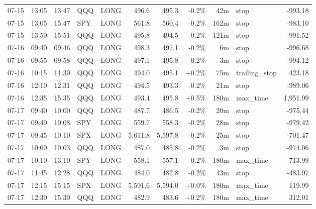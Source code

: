 \documentclass[11pt,a4paper,twoside]{article}
\begin{document}
\begin{center}
\begin{longtable}{>{\color{txtmain}}l l l l l r r r r >{\color{txtmain}}l r}
07-15 & 13:05 & 13:47 & QQQ & LONG & 496.6 & 495.3 & \textcolor{lossred}{-0.2\%} & 42m & stop & \textcolor{lossred}{-993.18} \\
07-15 & 13:05 & 15:47 & SPY & LONG & 561.8 & 560.4 & \textcolor{lossred}{-0.2\%} & 162m & stop & \textcolor{lossred}{-983.10} \\
07-15 & 13:50 & 15:51 & QQQ & LONG & 495.8 & 494.5 & \textcolor{lossred}{-0.2\%} & 121m & stop & \textcolor{lossred}{-991.52} \\
07-16 & 09:40 & 09:46 & QQQ & LONG & 498.3 & 497.1 & \textcolor{lossred}{-0.2\%} & 6m & stop & \textcolor{lossred}{-996.68} \\
07-16 & 09:55 & 09:58 & QQQ & LONG & 497.1 & 495.8 & \textcolor{lossred}{-0.2\%} & 3m & stop & \textcolor{lossred}{-994.12} \\
07-16 & 10:15 & 11:30 & QQQ & LONG & 494.0 & 495.1 & \textcolor{wingreen}{+0.2\%} & 75m & trailing\_stop & \textcolor{wingreen}{423.18} \\
07-16 & 12:10 & 12:31 & QQQ & LONG & 494.5 & 493.3 & \textcolor{lossred}{-0.2\%} & 21m & stop & \textcolor{lossred}{-989.06} \\
07-16 & 12:35 & 15:35 & QQQ & LONG & 493.4 & 495.8 & \textcolor{wingreen}{+0.5\%} & 180m & max\_time & \textcolor{wingreen}{1,951.99} \\
07-17 & 09:40 & 10:00 & QQQ & LONG & 487.7 & 486.5 & \textcolor{lossred}{-0.2\%} & 20m & stop & \textcolor{lossred}{-975.44} \\
07-17 & 09:40 & 10:08 & SPY & LONG & 559.7 & 558.3 & \textcolor{lossred}{-0.2\%} & 28m & stop & \textcolor{lossred}{-979.42} \\
07-17 & 09:45 & 10:10 & SPX & LONG & 5,611.8 & 5,597.8 & \textcolor{lossred}{-0.2\%} & 25m & stop & \textcolor{lossred}{-701.47} \\
07-17 & 10:00 & 10:03 & QQQ & LONG & 487.0 & 485.8 & \textcolor{lossred}{-0.2\%} & 3m & stop & \textcolor{lossred}{-974.06} \\
07-17 & 10:10 & 13:10 & SPY & LONG & 558.1 & 557.1 & \textcolor{lossred}{-0.2\%} & 180m & max\_time & \textcolor{lossred}{-713.99} \\
07-17 & 11:45 & 12:28 & QQQ & LONG & 484.0 & 482.8 & \textcolor{lossred}{-0.2\%} & 43m & stop & \textcolor{lossred}{-483.97} \\
07-17 & 12:15 & 15:15 & SPX & LONG & 5,591.6 & 5,594.0 & \textcolor{wingreen}{+0.0\%} & 180m & max\_time & \textcolor{wingreen}{119.99} \\
07-17 & 12:30 & 15:30 & QQQ & LONG & 482.9 & 483.6 & \textcolor{wingreen}{+0.2\%} & 180m & max\_time & \textcolor{wingreen}{312.01} \\

\end{longtable}
\end{center}
\end{document}
